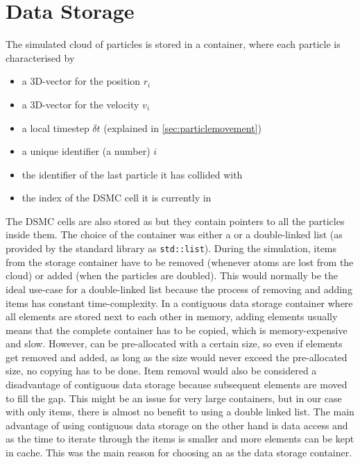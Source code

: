 \section{Data Storage}
\label{sec:eva_data_storage}
%
The simulated cloud of particles is stored in a \stdvector container, where each particle is characterised by
\begin{itemize}
    \item a 3D-vector for the position $r_i$
    \item a 3D-vector for the velocity $v_i$
    \item a local timestep $\delta t$ (explained in \cref{sec:particlemovement})
    \item a unique identifier (a number) $i$
    \item the identifier of the last particle it has collided with
    \item the index of the DSMC cell it is currently in
\end{itemize}
%
The DSMC cells are also stored as \stdvector but they contain pointers to all the particles inside them.
The choice of the container was either a \stdvector or a double-linked list (as provided by the \Cpp standard library as \texttt{std::list}). During the simulation, items from the storage container have to be removed (whenever atoms are lost from the cloud) or added (when the particles are doubled). This would normally be the ideal use-case for a double-linked list because the process of removing and adding items has constant time-complexity. In a contiguous data storage container where all elements are stored next to each other in memory, adding elements usually means that the complete container has to be copied, which is memory-expensive and slow. However, \stdvector can be pre-allocated with a certain size, so even if elements get removed and added, as long as the size would never exceed the pre-allocated size, no copying has to be done. Item removal would also be considered a disadvantage of contiguous data storage because subsequent elements are moved to fill the gap. This might be an issue for very large containers, but in our case with only  items, there is almost no benefit to using a double linked list.
The main advantage of using contiguous data storage on the other hand is data access and as the time to iterate through the items is smaller and more elements can be kept in cache. This was the main reason for choosing an \stdvector as the data storage container.
%
